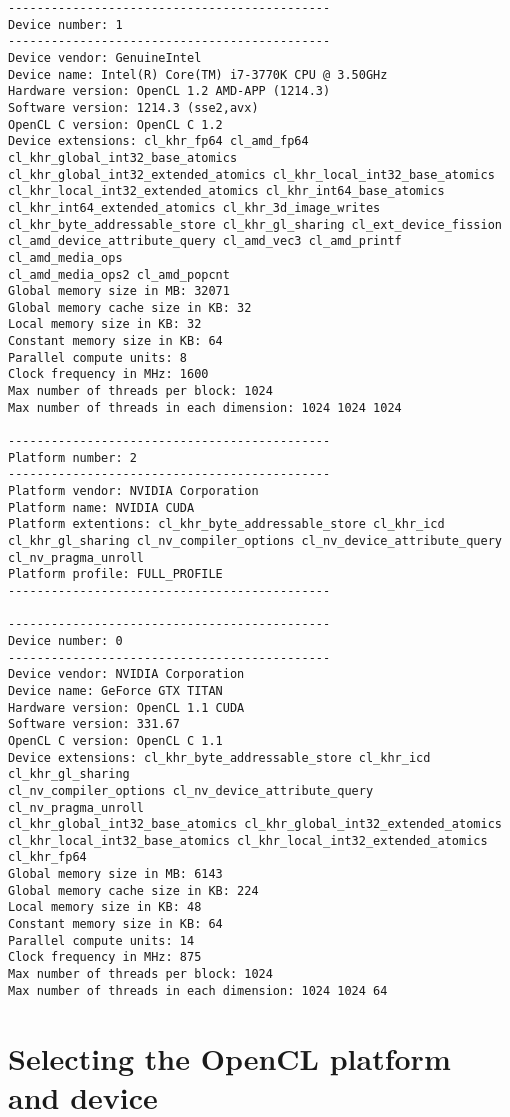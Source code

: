\begin{verbatim}
---------------------------------------------
Device number: 1
---------------------------------------------
Device vendor: GenuineIntel
Device name: Intel(R) Core(TM) i7-3770K CPU @ 3.50GHz
Hardware version: OpenCL 1.2 AMD-APP (1214.3)
Software version: 1214.3 (sse2,avx)
OpenCL C version: OpenCL C 1.2 
Device extensions: cl_khr_fp64 cl_amd_fp64 cl_khr_global_int32_base_atomics 
cl_khr_global_int32_extended_atomics cl_khr_local_int32_base_atomics 
cl_khr_local_int32_extended_atomics cl_khr_int64_base_atomics 
cl_khr_int64_extended_atomics cl_khr_3d_image_writes 
cl_khr_byte_addressable_store cl_khr_gl_sharing cl_ext_device_fission 
cl_amd_device_attribute_query cl_amd_vec3 cl_amd_printf cl_amd_media_ops 
cl_amd_media_ops2 cl_amd_popcnt 
Global memory size in MB: 32071
Global memory cache size in KB: 32
Local memory size in KB: 32
Constant memory size in KB: 64
Parallel compute units: 8
Clock frequency in MHz: 1600
Max number of threads per block: 1024
Max number of threads in each dimension: 1024 1024 1024

---------------------------------------------
Platform number: 2
---------------------------------------------
Platform vendor: NVIDIA Corporation
Platform name: NVIDIA CUDA
Platform extentions: cl_khr_byte_addressable_store cl_khr_icd 
cl_khr_gl_sharing cl_nv_compiler_options cl_nv_device_attribute_query 
cl_nv_pragma_unroll 
Platform profile: FULL_PROFILE
---------------------------------------------

---------------------------------------------
Device number: 0
---------------------------------------------
Device vendor: NVIDIA Corporation
Device name: GeForce GTX TITAN
Hardware version: OpenCL 1.1 CUDA
Software version: 331.67
OpenCL C version: OpenCL C 1.1 
Device extensions: cl_khr_byte_addressable_store cl_khr_icd cl_khr_gl_sharing 
cl_nv_compiler_options cl_nv_device_attribute_query cl_nv_pragma_unroll  
cl_khr_global_int32_base_atomics cl_khr_global_int32_extended_atomics 
cl_khr_local_int32_base_atomics cl_khr_local_int32_extended_atomics cl_khr_fp64 
Global memory size in MB: 6143
Global memory cache size in KB: 224
Local memory size in KB: 48
Constant memory size in KB: 64
Parallel compute units: 14
Clock frequency in MHz: 875
Max number of threads per block: 1024
Max number of threads in each dimension: 1024 1024 64

\end{verbatim}

\section{Selecting the OpenCL platform and device}

